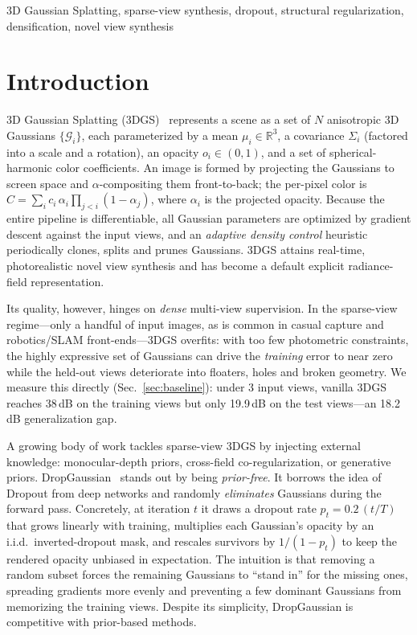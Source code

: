 \documentclass[conference]{IEEEtran}
\begin{document}
\begin{IEEEkeywords}
3D Gaussian Splatting, sparse-view synthesis, dropout, structural regularization,
densification, novel view synthesis
\end{IEEEkeywords}

\section{Introduction}
3D Gaussian Splatting (3DGS)~\cite{kerbl3Dgaussians} represents a scene as a set of
$N$ anisotropic 3D Gaussians $\{\mathcal{G}_i\}$, each parameterized by a mean
$\mu_i\in\mathbb{R}^3$, a covariance $\Sigma_i$ (factored into a scale and a
rotation), an opacity $o_i\in(0,1)$, and a set of spherical-harmonic color
coefficients. An image is formed by projecting the Gaussians to screen space and
$\alpha$-compositing them front-to-back; the per-pixel color is
$C=\sum_i c_i\,\alpha_i\prod_{j<i}(1-\alpha_j)$, where $\alpha_i$ is the projected
opacity. Because the entire pipeline is differentiable, all Gaussian parameters are
optimized by gradient descent against the input views, and an \emph{adaptive density
control} heuristic periodically clones, splits and prunes Gaussians. 3DGS attains
real-time, photorealistic novel view synthesis and has become a default explicit
radiance-field representation.

Its quality, however, hinges on \emph{dense} multi-view supervision. In the
sparse-view regime---only a handful of input images, as is common in casual capture
and robotics/SLAM front-ends---3DGS overfits: with too few photometric constraints,
the highly expressive set of Gaussians can drive the \emph{training} error to near
zero while the held-out views deteriorate into floaters, holes and broken geometry.
We measure this directly (Sec.~\ref{sec:baseline}): under 3 input views, vanilla 3DGS
reaches 38\,dB on the training views but only 19.9\,dB on the test views---an 18.2\,dB
generalization gap.

A growing body of work tackles sparse-view 3DGS by injecting external knowledge:
monocular-depth priors, cross-field co-regularization, or generative priors.
DropGaussian~\cite{park2025dropgaussian} stands out by being \emph{prior-free}. It
borrows the idea of Dropout from deep networks and randomly \emph{eliminates}
Gaussians during the forward pass. Concretely, at iteration $t$ it draws a dropout
rate $p_t=0.2\,(t/T)$ that grows linearly with training, multiplies each Gaussian's
opacity by an i.i.d.\ inverted-dropout mask, and rescales survivors by $1/(1-p_t)$ to
keep the rendered opacity unbiased in expectation. The intuition is that removing a
random subset forces the remaining Gaussians to ``stand in'' for the missing ones,
spreading gradients more evenly and preventing a few dominant Gaussians from
memorizing the training views. Despite its simplicity, DropGaussian is competitive
with prior-based methods.
\end{document}
